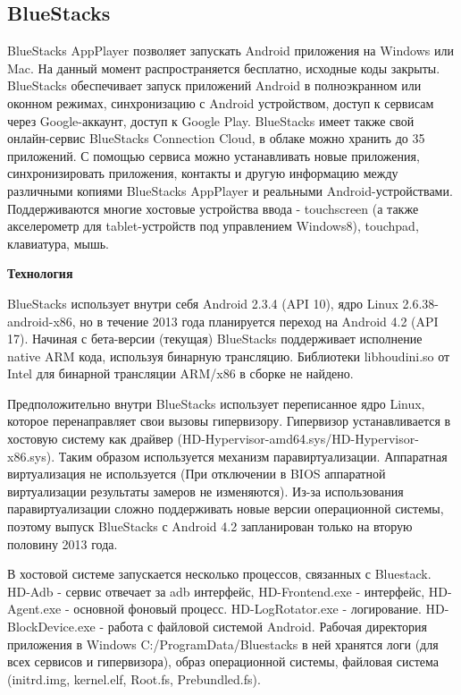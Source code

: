 \subsection{BlueStacks}

BlueStacks AppPlayer позволяет запускать Android приложения на Windows или Mac. На данный момент распространяется бесплатно, исходные коды закрыты. BlueStacks обеспечивает запуск приложений Android в полноэкранном или оконном режимах, синхронизацию с Android устройством, доступ к сервисам через Google-аккаунт, доступ к Google Play. BlueStacks имеет также свой онлайн-сервис BlueStacks Connection Cloud, в облаке можно хранить до 35 приложений. С помощью сервиса можно устанавливать новые приложения, синхронизировать приложения, контакты и другую информацию между различными копиями BlueStacks AppPlayer и реальными Android-устройствами. Поддерживаются многие хостовые устройства ввода - touchscreen (а также акселерометр для tablet-устройств под управлением Windows8), touchpad, клавиатура, мышь.

\textbf{Технология}

BlueStacks использует внутри себя Android 2.3.4 (API 10), ядро Linux 2.6.38-android-x86, но в течение 2013 года планируется переход на Android 4.2 (API 17). Начиная с бета-версии (текущая) BlueStacks поддерживает исполнение native ARM кода, используя бинарную трансляцию. Библиотеки libhoudini.so от Intel для бинарной трансляции ARM/x86 в сборке не найдено.

Предположительно внутри BlueStacks использует переписанное ядро Linux, которое перенаправляет свои вызовы гипервизору. Гипервизор устанавливается в хостовую систему как драйвер (HD-Hypervisor-amd64.sys/HD-Hypervisor-x86.sys). Таким образом используется механизм паравиртуализации. Аппаратная виртуализация не используется (При отключении в BIOS аппаратной виртуализации результаты замеров не изменяются). Из-за использования паравиртуализации сложно поддерживать новые версии операционной системы, поэтому выпуск BlueStacks с Android 4.2 запланирован только на вторую половину 2013 года.

В хостовой системе запускается несколько процессов, связанных с Bluestack. HD-Adb - сервис отвечает за adb интерфейс, HD-Frontend.exe - интерфейс, HD-Agent.exe - основной фоновый процесс. HD-LogRotator.exe - логирование. HD-BlockDevice.exe - работа с файловой системой Android. Рабочая директория приложения в Windows C:/ProgramData/Bluestacks в ней хранятся логи (для всех сервисов и гипервизора), образ операционной системы, файловая система (initrd.img, kernel.elf, Root.fs, Prebundled.fs).

